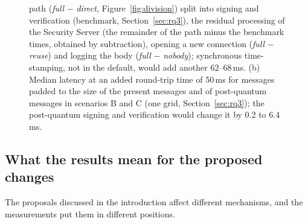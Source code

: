 \documentclass[conference,a4paper]{IEEEtran}
\newcommand{\newtext}[1]{{\color{blue}#1}}
\begin{document}
\begin{figure}[!tb]
{{path (\emph{full} $-$ \emph{direct}, \newtext{Figure~\ref{fig:division}}) split into signing and verification
(benchmark, Section~\ref{sec:rq3}), \newtext{the residual processing of the Security Server (the remainder of the path minus the benchmark times, obtained by subtraction)}, opening a new connection (\emph{full} $-$ \emph{reuse}) and logging the body
(\emph{full} $-$ \emph{nobody}); synchronous time-stamping, not in the default, would add another
62--68\,ms. (b) Median latency at an added round-trip time of 50\,ms for messages padded to the size
of the present messages and of post-quantum messages in scenarios B and C (one grid,
\newtext{Section~\ref{sec:rq3}}); the post-quantum signing and verification would change it by 0.2 to
6.4\,ms.}}
\label{fig:summary}
\end{figure}

\subsection{What the results mean for the proposed changes}\label{sec:pq}

The proposals discussed in the introduction affect different mechanisms, and the measurements put
them in different positions.
\end{document}
